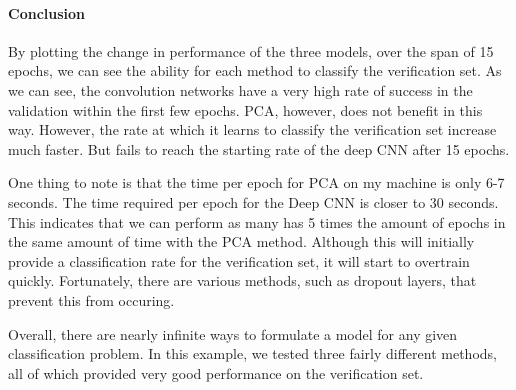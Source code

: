 \documentclass[11pt]{article}
\begin{document}
    \hypertarget{conclusion}{%
\paragraph{Conclusion}\label{conclusion}}

By plotting the change in performance of the three models, over the span
of 15 epochs, we can see the ability for each method to classify the
verification set. As we can see, the convolution networks have a very
high rate of success in the validation within the first few epochs. PCA,
however, does not benefit in this way. However, the rate at which it
learns to classify the verification set increase much faster. But fails
to reach the starting rate of the deep CNN after 15 epochs.

One thing to note is that the time per epoch for PCA on my machine is
only 6-7 seconds. The time required per epoch for the Deep CNN is closer
to 30 seconds. This indicates that we can perform as many has 5 times
the amount of epochs in the same amount of time with the PCA method.
Although this will initially provide a classification rate for the
verification set, it will start to overtrain quickly. Fortunately, there
are various methods, such as dropout layers, that prevent this from
occuring.

Overall, there are nearly infinite ways to formulate a model for any
given classification problem. In this example, we tested three fairly
different methods, all of which provided very good performance on the
verification set.
\end{document}
